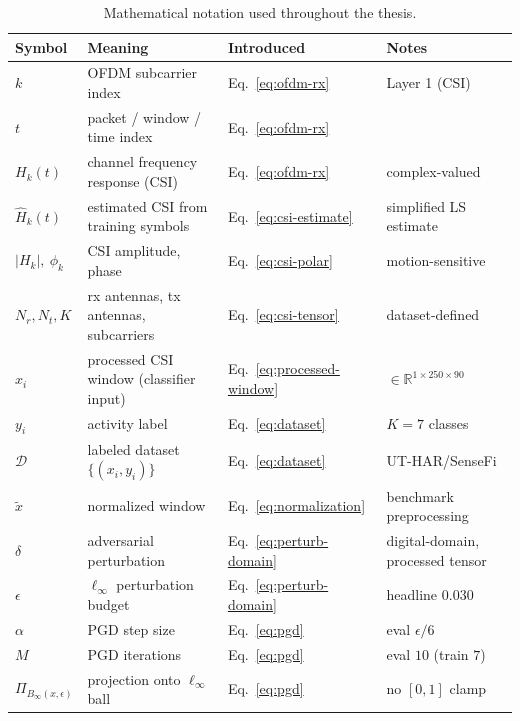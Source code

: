 \begin{table}[t]
  \centering
  \caption{Mathematical notation used throughout the thesis.}
  \label{tab:notation}
  \small
  \begin{tabular}{l l l l}
    \toprule
    Symbol & Meaning & Introduced & Notes \\
    \midrule
    $k$ & OFDM subcarrier index & Eq.~\ref{eq:ofdm-rx} & Layer 1 (CSI) \\
    $t$ & packet / window / time index & Eq.~\ref{eq:ofdm-rx} & \\
    $H_k(t)$ & channel frequency response (CSI) & Eq.~\ref{eq:ofdm-rx} & complex-valued \\
    $\hat{H}_k(t)$ & estimated CSI from training symbols & Eq.~\ref{eq:csi-estimate} & simplified LS estimate \\
    $\lvert H_k\rvert,\ \phi_k$ & CSI amplitude, phase & Eq.~\ref{eq:csi-polar} & motion-sensitive \\
    $N_r,N_t,K$ & rx antennas, tx antennas, subcarriers & Eq.~\ref{eq:csi-tensor} & dataset-defined \\
    $x_i$ & processed CSI window (classifier input) & Eq.~\ref{eq:processed-window} & $\in\mathbb{R}^{1\times250\times90}$ \\
    $y_i$ & activity label & Eq.~\ref{eq:dataset} & $K=7$ classes \\
    $\mathcal{D}$ & labeled dataset $\{(x_i,y_i)\}$ & Eq.~\ref{eq:dataset} & UT-HAR/SenseFi \\
    $\tilde{x}$ & normalized window & Eq.~\ref{eq:normalization} & benchmark preprocessing \\
    $\delta$ & adversarial perturbation & Eq.~\ref{eq:perturb-domain} & digital-domain, processed tensor \\
    $\epsilon$ & $\ell_\infty$ perturbation budget & Eq.~\ref{eq:perturb-domain} & headline $0.030$ \\
    $\alpha$ & PGD step size & Eq.~\ref{eq:pgd} & eval $\epsilon/6$ \\
    $M$ & PGD iterations & Eq.~\ref{eq:pgd} & eval $10$ (train $7$) \\
    $\Pi_{B_\infty(x,\epsilon)}$ & projection onto $\ell_\infty$ ball & Eq.~\ref{eq:pgd} & no $[0,1]$ clamp \\

\end{tabular}
\end{table}
